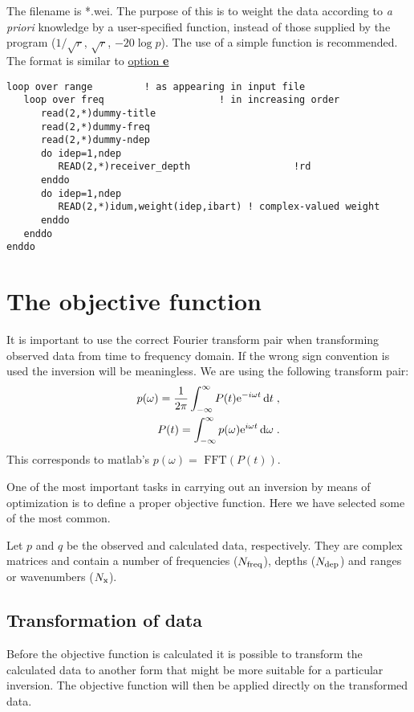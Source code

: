 \documentclass{saclantc}
\begin{document}
The filename is *.wei.
The purpose of this is to weight the data according to {\it a priori}
knowledge by a user-specified function, instead of those supplied by the
program ($1/\sqrt{r}$, $\sqrt{r}$, $-20 \log{p}$).
The use of a simple function is recommended.
The format is similar to  \underline{option {\bf e}}

\small
\begin{verbatim} 
loop over range         ! as appearing in input file
   loop over freq                    ! in increasing order
      read(2,*)dummy-title
      read(2,*)dummy-freq 
      read(2,*)dummy-ndep
      do idep=1,ndep
         READ(2,*)receiver_depth                  !rd
      enddo
      do idep=1,ndep
         READ(2,*)idum,weight(idep,ibart) ! complex-valued weight
      enddo
   enddo
enddo
\end{verbatim}
\normalsize


\section{The  objective function}
\label{se:obj}
It is  important to use the correct Fourier transform pair when
transforming observed data from time to  frequency domain. If the
wrong sign convention is used the inversion will be meaningless. We
are using the  following transform pair:
\begin{eqnarray}
p(\omega )=
\frac{1}{2 \pi}\int_{-\infty}^{\infty} P(t){\rm e}^{-i\omega t} \, {\rm d}t \; ,\\
P(t)=
\int_{-\infty}^{\infty} p(\omega ) {\rm e}^{i \omega t} \, {\rm d} \omega \; .
\end{eqnarray}
This corresponds to matlab's $p(\omega )= \mbox{ FFT} (P(t))$. 

One of the most important tasks in carrying out an inversion by means
of optimization is to define a proper objective function. Here we have
selected some of the most common. 

Let $p$ and $q$ be the observed and calculated data, respectively.
They are complex matrices and contain a number of frequencies ($N_{\rm
freq}$), depths ($N_{\rm dep}$) and ranges or wavenumbers ($N_{\rm x}$).


\subsection{Transformation of data}
Before the objective function is calculated it is possible to transform
the calculated data to another form that might be more suitable
for a particular inversion. The objective function will then be applied
directly on the transformed data.
\end{document}
